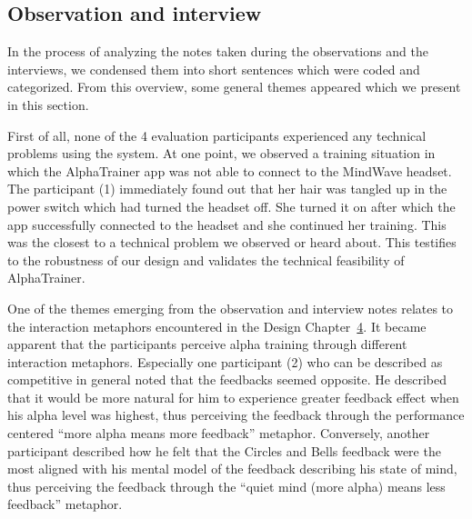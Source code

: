 \documentclass[a4paper,10pt,english,lof,lot,twoside]{puthesis}
\begin{document}
\subsection{Observation and interview}
\label{ch-evaluation/index:observation-and-interview}
In the process of analyzing the notes taken during the observations and the interviews, we condensed them into short sentences which were coded and categorized. From this overview, some general themes appeared which we present in this section.

First of all, none of the 4 evaluation participants experienced any technical problems using the system. At one point, we observed a training situation in which the AlphaTrainer app was not able to connect to the MindWave headset. The participant (1) immediately found out that her hair was tangled up in the power switch which had turned the headset off. She turned it on after which the app successfully connected to the headset and she continued her training. This was the closest to a technical problem we observed or heard about. This testifies to the robustness of our design and validates the technical feasibility of AlphaTrainer.

One of the themes emerging from the observation and interview notes relates to the interaction metaphors encountered in the Design Chapter {\hyperref[ch-design/index:ch-design]{4}}. It became apparent that the participants perceive alpha training through different interaction metaphors. Especially one participant (2) who can be described as competitive in general noted that the feedbacks seemed opposite. He described that it would be more natural for him to experience greater feedback effect when his alpha level was highest, thus perceiving the feedback through the performance centered ``more alpha means more feedback'' metaphor. Conversely, another participant described how he felt that the Circles and Bells feedback were the most aligned with his mental model of the feedback describing his state of mind, thus perceiving the feedback through the ``quiet mind (more alpha) means less feedback'' metaphor.
\end{document}
